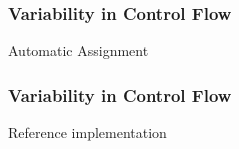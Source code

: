 \documentclass[xcolor=svgnames]{beamer}
\begin{document}
\begin{frame}
\frametitle{Variability in Control Flow}

\begin{block}{Automatic Assignment}
\begin{center} 
\end{center}
\end{block}
\end{frame}

\begin{frame}
\frametitle{Variability in Control Flow}
\begin{block}{Reference implementation}
\begin{center} 
\end{center}
\end{block}
\end{frame}
\end{document}
